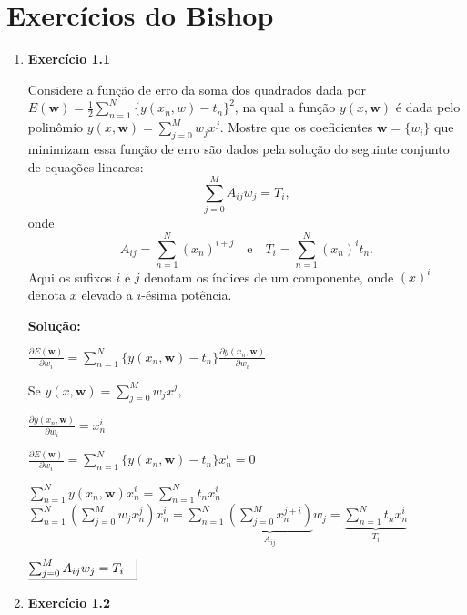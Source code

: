 \section*{Exercícios do Bishop}

\begin{enumerate}


\item \textbf{Exercício 1.1} \par

Considere a função de erro da soma dos quadrados dada por $E(\boldsymbol{w})=\frac{1}{2}\sum_{n=1}^{N} \{y(x_n,w)-t_n\}^2$, na qual a função $y(x,\boldsymbol{w})$ é dada pelo polinômio $y(x,\boldsymbol{w})=\sum_{j=0}^{M} w_jx^j$. Mostre que os coeficientes $\boldsymbol{w} = \{w_i\}$ que minimizam essa função de erro são dados pela solução do seguinte conjunto de equações lineares:
\begin{equation*}
    \sum_{j=0}^{M}A_{ij} w_j = T_i, 
\end{equation*}
onde 
\begin{equation*}
    A_{ij} = \sum_{n=1}^{N} (x_n)^{i+j} \quad \text{e} \quad T_i=\sum_{n=1}^{N} (x_n)^i t_n.
\end{equation*}
Aqui os sufixos $i$ e $j$ denotam os índices de um componente, onde $(x)^i$ denota $x$ elevado a $i$-ésima potência.
\newline \par
\textbf{Solução:}

$\frac{\partial E(\boldsymbol{w})}{\partial w_i} = \sum_{n=1}^{N} \{y(x_n, \boldsymbol{w}) - t_n\} \frac{\partial y(x_n, \boldsymbol{w})}{\partial w_i}$ 

Se $y(x,\boldsymbol{w})=\sum_{j=0}^{M} w_j x^j,$ 

$\frac{\partial y(x_n, \boldsymbol{w})}{\partial w_i} = x_n^i $

$ \frac{\partial E(\boldsymbol{w})}{\partial w_i} = \sum_{n=1}^{N} \{y(x_n, \boldsymbol{w}) - t_n\} x_n^i = 0 $

$\sum_{n=1}^{N} y(x_n, \boldsymbol{w})x_n^i = \sum_{n=1}^{N} t_n x_n^i$\\

$\sum_{n=1}^{N} \left( \sum_{j=0}^{M} w_j x_n^j \right) x_n^i = \sum_{n=1}^{N} \underbrace{\left( \sum_{j=0}^{M} x_n^{j+i} \right)}_{A_{ij}} w_j = \underbrace{\sum_{n=1}^{N} t_n x_n^i}_{T_i}$

$ \underline{\sum_{j=0}^{M}A_{ij} w_j = T_i\quad} \vline $

\item \textbf{Exercício 1.2} \par


\end{enumerate}
